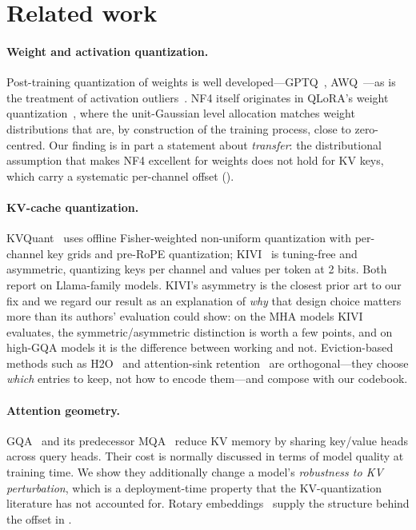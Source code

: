 \documentclass{article}
\theoremstyle{plain}
\theoremstyle{definition}
\begin{document}
\section{Related work}
\label{sec:related}
\paragraph{Weight and activation quantization.} Post-training quantization of weights is
well developed---GPTQ~\citep{frantar2023gptq}, AWQ~\citep{lin2024awq}---as is the treatment of
activation outliers~\citep{dettmers2022llmint8,xiao2023smoothquant}. NF4 itself originates in
QLoRA's weight quantization~\citep{dettmers2023qlora}, where the unit-Gaussian level allocation
matches weight distributions that are, by construction of the training process, close to
zero-centred. Our finding is in part a statement about \emph{transfer}: the distributional
assumption that makes NF4 excellent for weights does not hold for KV keys, which carry a
systematic per-channel offset ().

\paragraph{KV-cache quantization.} KVQuant~\citep{hooper2024kvquant} uses offline
Fisher-weighted non-uniform quantization with per-channel key grids and pre-RoPE quantization;
KIVI~\citep{liu2024kivi} is tuning-free and asymmetric, quantizing keys per channel and values
per token at 2 bits. Both report on Llama-family models. KIVI's asymmetry is the closest prior
art to our fix and we regard our result as an explanation of \emph{why} that design choice
matters more than its authors' evaluation could show: on the MHA models KIVI evaluates, the
symmetric/asymmetric distinction is worth a few points, and on high-GQA models it is the
difference between working and not. Eviction-based methods such as
H2O~\citep{zhang2023h2o} and attention-sink retention~\citep{xiao2024streamingllm} are
orthogonal---they choose \emph{which} entries to keep, not how to encode them---and compose
with our codebook.

\paragraph{Attention geometry.} GQA~\citep{ainslie2023gqa} and its
predecessor MQA~\citep{shazeer2019mqa} reduce KV memory by sharing key/value heads across query
heads. Their cost is normally discussed in terms of model quality at training time. We show
they additionally change a model's \emph{robustness to KV perturbation}, which is a
deployment-time property that the KV-quantization literature has not accounted for.
Rotary embeddings~\citep{su2024roformer} supply the structure behind the offset in
.
\end{document}

